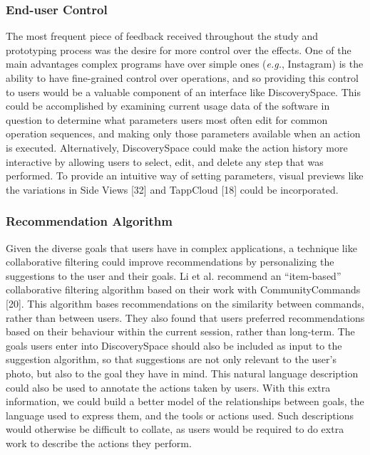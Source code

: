 \subsubsection{End-user Control}
The most frequent piece of feedback received throughout the study and prototyping process was the desire for more control over the effects. One of the main advantages complex programs have over simple ones (\textit{e.g.}, Instagram) is the ability to have fine-grained control over operations, and so providing this control to users would be a valuable component of an interface like Discovery\-Space. This could be accomplished by examining current usage data of the software in question to determine what parameters users most often edit for common operation sequences, and making only those parameters available when an action is executed. Alternatively, Discovery\-Space could make the action history more interactive by allowing users to select, edit, and delete any step that was performed. To provide an intuitive way of setting parameters, visual previews like the variations in Side Views [32] and TappCloud [18] could be incorporated. 

\subsubsection{Recommendation Algorithm}
Given the diverse goals that users have in complex applications, a technique like collaborative filtering could improve recommendations by personalizing the suggestions to the user and their goals. Li et al. recommend an ``item-based'' collaborative filtering algorithm based on their work with CommunityCommands [20]. This algorithm bases recommendations on the similarity between commands, rather than between users. They also found that users preferred recommendations based on their behaviour within the current session, rather than long-term. The goals users enter into Discovery\-Space should also be included as input to the suggestion algorithm, so that suggestions are not only relevant to the user's photo, but also to the goal they have in mind. This natural language description could also be used to annotate the actions taken by users. With this extra information, we could build a better model of the relationships between goals, the language used to express them, and the tools or actions used. Such descriptions would otherwise be difficult to collate, as users would be required to do extra work to describe the actions they perform.

